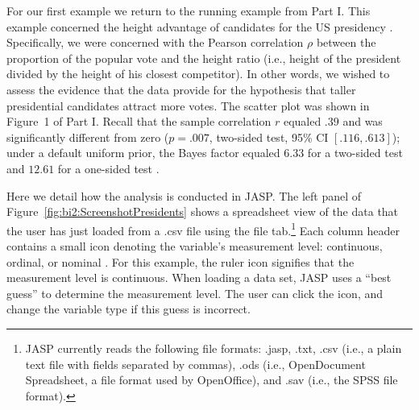 For our first example we return to the running example from Part I. This example concerned the height advantage of candidates for the US presidency \cite{StulpEtAl2013}. Specifically, we were concerned with the Pearson correlation $\rho$ between the proportion of the popular vote and the height ratio (i.e., height of the president divided by the height of his closest competitor). In other words, we wished to assess the evidence that the data provide for the hypothesis that taller presidential candidates attract more votes. The scatter plot was shown in Figure~1 of Part I. Recall that the sample correlation $r$ equaled $.39$ and was significantly different from zero ($p = .007$, two-sided test, 95\% CI $[.116, .613]$); under a default uniform prior, the Bayes factor equaled $6.33$ for a two-sided test and $12.61$ for a one-sided test \cite{WagenmakersEtAlinpressPBRPartI}.

Here we detail how the analysis is conducted in JASP. The left panel of Figure~\ref{fig:bi2:ScreenshotPresidents} shows a spreadsheet view of the data that the user has just loaded from a .csv file using the file tab.\footnote{JASP currently reads the following file formats: .jasp, .txt, .csv (i.e., a plain text file with fields separated by commas), .ods (i.e., OpenDocument Spreadsheet, a file format used by OpenOffice), and .sav (i.e., the SPSS file format).} Each column header contains a small icon denoting the variable's measurement level: continuous, ordinal, or nominal \cite{Stevens1946}. For this example, the ruler icon signifies that the measurement level is continuous. When loading a data set, JASP uses a ``best guess'' to determine the measurement level. The user can click the icon, and change the variable type if this guess is incorrect.

